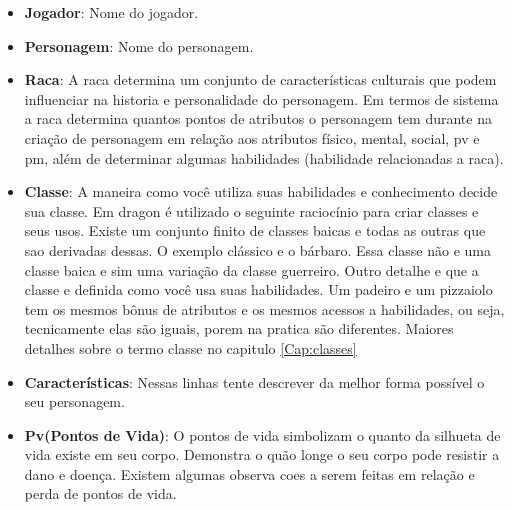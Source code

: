 \begin{itemize}
	\item \textbf{Jogador}: Nome do jogador.
	\item \textbf{Personagem}: Nome do personagem.
  	\item \textbf{Raca}: A raca determina um conjunto de características culturais que podem influenciar na historia e personalidade do personagem. Em termos de sistema a raca determina quantos pontos de atributos o personagem tem durante na criação de personagem em relação aos atributos físico, mental, social, pv e pm, além de determinar algumas habilidades (habilidade relacionadas a raca). 
  \item \textbf{Classe}: A maneira como você utiliza suas habilidades e conhecimento decide sua classe. Em dragon é utilizado o seguinte raciocínio para criar classes e seus usos. Existe um conjunto finito de classes baicas e todas as outras que sao derivadas dessas. O exemplo clássico e o bárbaro. Essa classe não e uma classe baica e sim uma variação da classe guerreiro. Outro detalhe e que a classe e definida como você usa suas habilidades. Um padeiro e um pizzaiolo tem os mesmos bônus de atributos e os mesmos acessos a habilidades, ou seja, tecnicamente elas são iguais, porem na pratica são diferentes. Maiores detalhes sobre o termo classe no capitulo \ref{Cap:classes}

  \item \textbf{Características}: Nessas linhas tente descrever da melhor forma possível o seu personagem. 
  \item \textbf{Pv(Pontos de Vida)}: O pontos de vida simbolizam o quanto da silhueta de vida existe em seu corpo. Demonstra o quão longe o seu corpo pode resistir a dano e doença. Existem algumas observa coes a serem feitas em relação e perda de pontos de vida.


\end{itemize}
